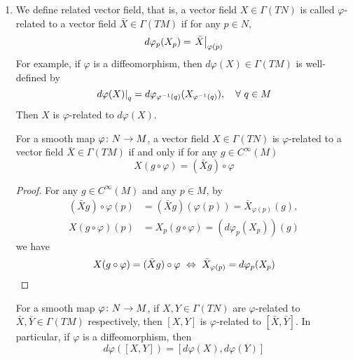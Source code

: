 \begin{enumerate}[label=\Roman{*}.]
	\item We define related vector field, that is, a vector field $X \in \Gamma(TN)$ is called $\varphi$-related to a vector field $\bar{X} \in \Gamma(TM)$ if for any $p \in N$,
	\begin{equation*}
		d\varphi_{p}(X_{p})= \left.\bar{X}\right\lvert_{\varphi(p)}
	\end{equation*}
	For example, if $\varphi$ is a diffeomorphism, then $d\varphi(X) \in \Gamma(TM)$ is well-defined by
	\begin{equation*}
		\left.d\varphi(X)\right\lvert_{q} = d\varphi_{\varphi^{-1}(q)}(X_{\varphi^{-1}(q)}),\quad \forall~q \in M
	\end{equation*}
	Then $X$ is $\varphi$-related to $d\varphi(X)$.
	\begin{lem}
		For a smooth map $\varphi \colon N \rightarrow M$, a vector field $X \in \Gamma(TN)$ is $\varphi$-related to a vector field $\bar{X} \in \Gamma(TM)$ if and only if for any $g \in C^\infty(M)$
		\begin{equation*}
			X(g \circ \varphi) = (\bar{X}g)\circ \varphi
		\end{equation*}
	\end{lem}
	\begin{proof}
		For any $g \in C^\infty(M)$ and any $p \in M$, by
		\begin{equation*}
			\begin{aligned}
				(\bar{X}g)\circ \varphi(p)&= (\bar{X}g)(\varphi(p)) = \bar{X}_{\varphi(p)}(g),\\
				X(g \circ \varphi)(p) &= X_p(g \circ \varphi) = (d\varphi_p(X_p))(g)
			\end{aligned}
		\end{equation*}
		we have
		\begin{equation*}
			X(g \circ \varphi) = (\bar{X}g)\circ \varphi ~\Leftrightarrow~\bar{X}_{\varphi(p)} = d\varphi_p(X_p) \qedhere
		\end{equation*}
	\end{proof}
	\begin{prop}
		For a smooth map $\varphi \colon N \rightarrow M$, if $X,Y \in \Gamma(TN)$ are $\varphi$-related to $\bar{X},\bar{Y} \in \Gamma(TM)$ respectively, then $[X,Y]$ is $\varphi$-related to $[\bar{X},\bar{Y}]$. In particular, if $\varphi$ is a diffeomorphism, then
		\begin{equation*}
			d\varphi([X,Y]) = [d\varphi(X),d\varphi(Y)]
		\end{equation*}
	\end{prop}

\end{enumerate}
